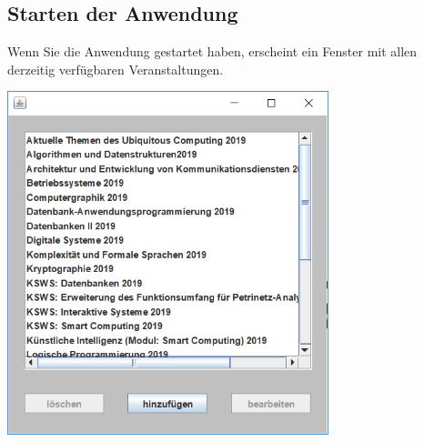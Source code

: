 \documentclass{Handbuch}
\begin{document}
\subsection{Starten der Anwendung}
Wenn Sie die Anwendung gestartet haben, erscheint ein Fenster mit allen derzeitig verfügbaren Veranstaltungen.
\begin{center}
	\includegraphics[width=0.7\textwidth]{img_adminGUI_01.png}
\end{center}
\end{document}
